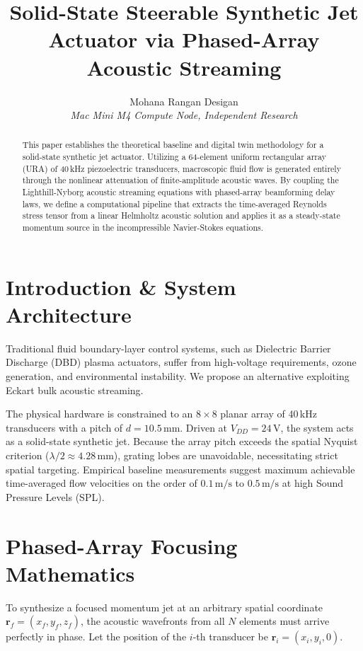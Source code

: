 \documentclass[journal, 10pt]{IEEEtran}
\title{Solid-State Steerable Synthetic Jet Actuator via Phased-Array Acoustic Streaming}
\author{Mohana Rangan Desigan\\ \textit{Mac Mini M4 Compute Node, Independent Research}}
\begin{document}
\maketitle

\begin{abstract}
This paper establishes the theoretical baseline and digital twin methodology for a solid-state synthetic jet actuator. Utilizing a 64-element uniform rectangular array (URA) of 40\,kHz piezoelectric transducers, macroscopic fluid flow is generated entirely through the nonlinear attenuation of finite-amplitude acoustic waves. By coupling the Lighthill-Nyborg acoustic streaming equations with phased-array beamforming delay laws, we define a computational pipeline that extracts the time-averaged Reynolds stress tensor from a linear Helmholtz acoustic solution and applies it as a steady-state momentum source in the incompressible Navier-Stokes equations.
\end{abstract}

\section{Introduction \& System Architecture}
Traditional fluid boundary-layer control systems, such as Dielectric Barrier Discharge (DBD) plasma actuators, suffer from high-voltage requirements, ozone generation, and environmental instability. We propose an alternative exploiting Eckart bulk acoustic streaming. 

The physical hardware is constrained to an $8 \times 8$ planar array of 40\,kHz transducers with a pitch of $d = 10.5\,\text{mm}$. Driven at $V_{DD} = 24\,\text{V}$, the system acts as a solid-state synthetic jet. Because the array pitch exceeds the spatial Nyquist criterion ($\lambda/2 \approx 4.28\,\text{mm}$), grating lobes are unavoidable, necessitating strict spatial targeting. Empirical baseline measurements suggest maximum achievable time-averaged flow velocities on the order of $0.1\,\text{m/s}$ to $0.5\,\text{m/s}$ at high Sound Pressure Levels (SPL).

\section{Phased-Array Focusing Mathematics}
To synthesize a focused momentum jet at an arbitrary spatial coordinate $\mathbf{r}_f = (x_f, y_f, z_f)$, the acoustic wavefronts from all $N$ elements must arrive perfectly in phase. Let the position of the $i$-th transducer be $\mathbf{r}_i = (x_i, y_i, 0)$.
\end{document}
